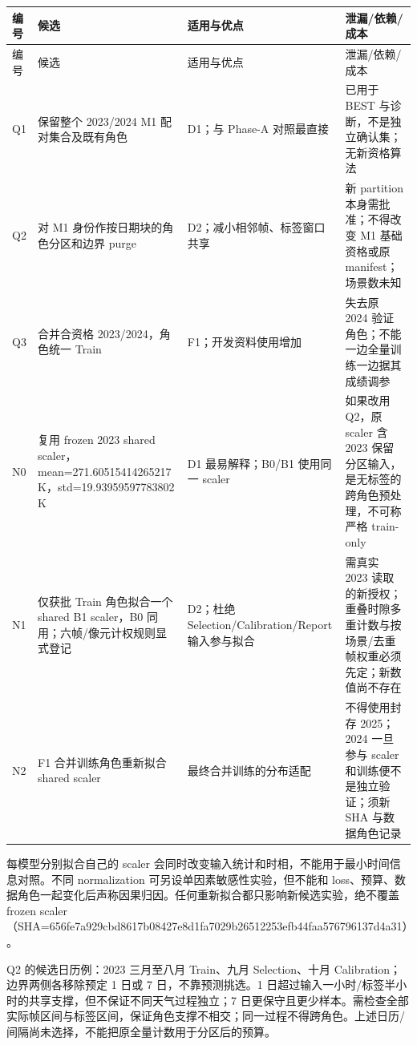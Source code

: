 \documentclass[UTF8,fontset=fandol,10pt]{ctexart}
\begin{document}
\begingroup\small\setlength{\tabcolsep}{3pt}\renewcommand{\arraystretch}{1.12}
\begin{longtable}{>{\raggedright\arraybackslash}p{\dimexpr(\linewidth-8\tabcolsep)/4\relax}>{\raggedright\arraybackslash}p{\dimexpr(\linewidth-8\tabcolsep)/4\relax}>{\raggedright\arraybackslash}p{\dimexpr(\linewidth-8\tabcolsep)/4\relax}>{\raggedright\arraybackslash}p{\dimexpr(\linewidth-8\tabcolsep)/4\relax}}
\toprule
编号 & 候选 & 适用与优点 & 泄漏/\allowbreak{}依赖/\allowbreak{}成本 \\
\midrule\endfirsthead
编号 & 候选 & 适用与优点 & 泄漏/\allowbreak{}依赖/\allowbreak{}成本 \\
\midrule\endhead
Q1 & 保留整个 2023/\allowbreak{}2024 M1 配对集合及既有角色 & D1；与 Phase-A 对照最直接 & 2024 已用于 BEST 与诊断，不是独立确认集；无新资格算法 \\
Q2 & 对 M1 身份作按日期块的角色分区和边界 purge & D2；减小相邻帧、标签窗口共享 & 新 partition 本身需批准；不得改变 M1 基础资格或原 manifest；场景数未知 \\
Q3 & 合并合资格 2023/\allowbreak{}2024，角色统一 Train & F1；开发资料使用增加 & 失去原 2024 验证角色；不能一边全量训练一边据其成绩调参 \\
N0 & 复用 frozen 2023 shared scaler，mean=271.60515414265217 K，std=19.93959597783802 K & D1 最易解释；B0/\allowbreak{}B1 使用同一 scaler & 如果改用 Q2，原 scaler 含 2023 保留分区输入，是无标签的跨角色预处理，不可称严格 train-only \\
N1 & 仅获批 Train 角色拟合一个 shared B1 scaler，B0 同用；六帧/\allowbreak{}像元计权规则显式登记 & D2；杜绝 Selection/\allowbreak{}Calibration/\allowbreak{}Report 输入参与拟合 & 需真实 2023 读取的新授权；重叠时隙多重计数与按场景/\allowbreak{}去重帧权重必须先定；新数值尚不存在 \\
N2 & F1 合并训练角色重新拟合 shared scaler & 最终合并训练的分布适配 & 不得使用封存 2025；2024 一旦参与 scaler 和训练便不是独立验证；须新 SHA 与数据角色记录 \\
\bottomrule\end{longtable}\endgroup

每模型分别拟合自己的 scaler 会同时改变输入统计和时相，不能用于最小时间信息对照。不同 normalization 可另设单因素敏感性实验，但不能和 loss、预算、数据角色一起变化后声称因果归因。任何重新拟合都只影响新候选实验，绝不覆盖 frozen scaler（SHA=656fe7a929cb\allowbreak{}d8617b08427e\allowbreak{}8d1fa7029b26\allowbreak{}512253efb44f\allowbreak{}aa576796137d\allowbreak{}4a31）。

Q2 的候选日历例：2023 三月至八月 Train、九月 Selection、十月 Calibration；边界两侧各移除预定 1 日或 7 日，不靠预测挑选。1 日超过输入一小时/\allowbreak{}标签半小时的共享支撑，但不保证不同天气过程独立；7 日更保守且更少样本。需检查全部实际帧区间与标签区间，保证角色支撑不相交；同一过程不得跨角色。上述日历/\allowbreak{}间隔尚未选择，不能把原全量计数用于分区后的预算。
\end{document}
